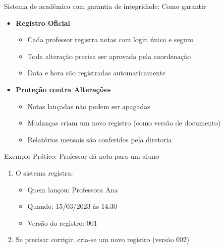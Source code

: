 \begin{frame}{Sistema de acadêmico com garantia de integridade: Como garantir}

    \begin{itemize}
        \item \textbf{Registro Oficial}
              \begin{itemize}
                  \item[•] Cada professor registra notas com login único e seguro
                  \item[•] Toda alteração precisa ser aprovada pela coordenação
                  \item[•] Data e hora são registradas automaticamente
              \end{itemize}

        \item \textbf{Proteção contra Alterações}
              \begin{itemize}
                  \item[•] Notas lançadas não podem ser apagadas
                  \item[•] Mudanças criam um novo registro (como versão de documento)
                  \item[•] Relatórios mensais são conferidos pela diretoria
              \end{itemize}
    \end{itemize}


    \begin{exampleblock}{Exemplo Prático: Professor dá nota para um aluno}
        \begin{enumerate}
            \item O sistema registra:
                  \begin{itemize}
                      \item Quem lançou: Professora Ana
                      \item Quando: 15/03/2023 às 14:30
                      \item Versão do registro: 001
                  \end{itemize}
            \item Se precisar corrigir, cria-se um novo registro (versão 002)
        \end{enumerate}
    \end{exampleblock}
\end{frame}

